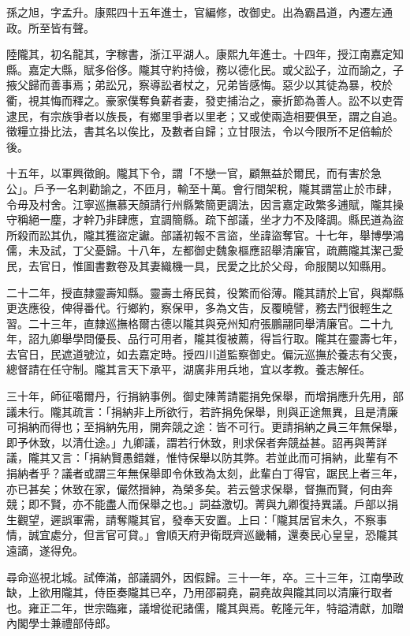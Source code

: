 \begin{pinyinscope}
孫之旭，字孟升。康熙四十五年進士，官編修，改御史。出為霸昌道，內遷左通政。所至皆有聲。

陸隴其，初名龍其，字稼書，浙江平湖人。康熙九年進士。十四年，授江南嘉定知縣。嘉定大縣，賦多俗侈。隴其守約持儉，務以德化民。或父訟子，泣而諭之，子掖父歸而善事焉；弟訟兄，察導訟者杖之，兄弟皆感悔。惡少以其徒為暴，校於衢，視其悔而釋之。豪家僕奪負薪者妻，發吏捕治之，豪折節為善人。訟不以吏胥逮民，有宗族爭者以族長，有鄉里爭者以里老；又或使兩造相要俱至，謂之自追。徵糧立掛比法，書其名以俟比，及數者自歸；立甘限法，令以今限所不足倍輸於後。

十五年，以軍興徵餉。隴其下令，謂「不戀一官，顧無益於爾民，而有害於急公」。戶予一名刺勸諭之，不匝月，輸至十萬。會行間架稅，隴其謂當止於市肆，令毋及村舍。江寧巡撫慕天顏請行州縣繁簡更調法，因言嘉定政繁多逋賦，隴其操守稱絕一塵，才幹乃非肆應，宜調簡縣。疏下部議，坐才力不及降調。縣民道為盜所殺而訟其仇，隴其獲盜定讞。部議初報不言盜，坐諱盜奪官。十七年，舉博學鴻儒，未及試，丁父憂歸。十八年，左都御史魏象樞應詔舉清廉官，疏薦隴其潔己愛民，去官日，惟圖書數卷及其妻織機一具，民愛之比於父母，命服闋以知縣用。

二十二年，授直隸靈壽知縣。靈壽土瘠民貧，役繁而俗薄。隴其請於上官，與鄰縣更迭應役，俾得番代。行鄉約，察保甲，多為文告，反覆曉譬，務去鬥很輕生之習。二十三年，直隸巡撫格爾古德以隴其與兗州知府張鵬翮同舉清廉官。二十九年，詔九卿舉學問優長、品行可用者，隴其復被薦，得旨行取。隴其在靈壽七年，去官日，民遮道號泣，如去嘉定時。授四川道監察御史。偏沅巡撫於養志有父喪，總督請在任守制。隴其言天下承平，湖廣非用兵地，宜以孝教。養志解任。

三十年，師征噶爾丹，行捐納事例。御史陳菁請罷捐免保舉，而增捐應升先用，部議未行。隴其疏言：「捐納非上所欲行，若許捐免保舉，則與正途無異，且是清廉可捐納而得也；至捐納先用，開奔競之途：皆不可行。更請捐納之員三年無保舉，即予休致，以清仕途。」九卿議，謂若行休致，則求保者奔競益甚。詔再與菁詳議，隴其又言：「捐納賢愚錯雜，惟恃保舉以防其弊。若並此而可捐納，此輩有不捐納者乎？議者或謂三年無保舉即令休致為太刻，此輩白丁得官，踞民上者三年，亦已甚矣；休致在家，儼然搢紳，為榮多矣。若云營求保舉，督撫而賢，何由奔競；即不賢，亦不能盡人而保舉之也。」詞益激切。菁與九卿復持異議。戶部以捐生觀望，遲誤軍需，請奪隴其官，發奉天安置。上曰：「隴其居官未久，不察事情，誠宜處分，但言官可貸。」會順天府尹衛既齊巡畿輔，還奏民心皇皇，恐隴其遠謫，遂得免。

尋命巡視北城。試俸滿，部議調外，因假歸。三十一年，卒。三十三年，江南學政缺，上欲用隴其，侍臣奏隴其已卒，乃用邵嗣堯，嗣堯故與隴其同以清廉行取者也。雍正二年，世宗臨雍，議增從祀諸儒，隴其與焉。乾隆元年，特謚清獻，加贈內閣學士兼禮部侍郎。


\end{pinyinscope}
